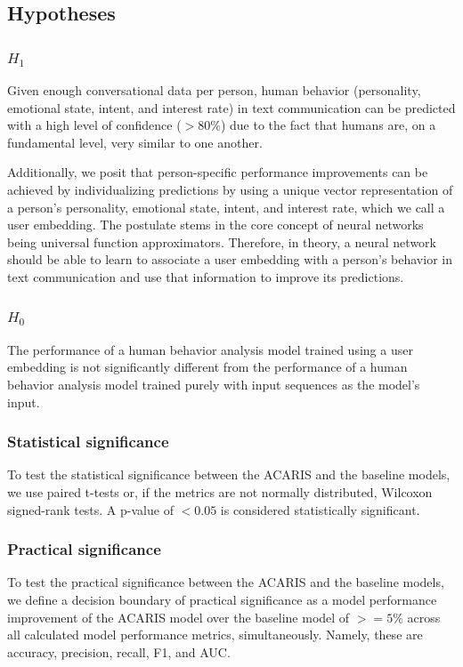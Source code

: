 \documentclass{article}
\begin{document}
\subsection{Hypotheses}
\subsubsection{$H_1$}
Given enough conversational data per person, human behavior (personality, emotional state, intent, and interest rate) in text communication can be predicted with a high level of confidence ($>80\%$) due to the fact that humans are, on a fundamental level, very similar to one another.

Additionally, we posit that person-specific performance improvements can be achieved by individualizing predictions by using a unique vector representation of a person's personality, emotional state, intent, and interest rate, which we call a user embedding. The postulate stems in the core concept of neural networks being universal function approximators. Therefore, in theory, a neural network should be able to learn to associate a user embedding with a person's behavior in text communication and use that information to improve its predictions.

\subsubsection{$H_0$}
The performance of a human behavior analysis model trained using a user embedding is not significantly different from the performance of a human behavior analysis model trained purely with input sequences as the model's input.

\subsubsection{Statistical significance}
To test the statistical significance between the ACARIS and the baseline models, we use paired t-tests or, if the metrics are not normally distributed, Wilcoxon signed-rank tests. A p-value of $<0.05$ is considered statistically significant.

\subsubsection{Practical significance}
To test the practical significance between the ACARIS and the baseline models, we define a decision boundary of practical significance as a model performance improvement of the ACARIS model over the baseline model of $>=5\%$ across all calculated model performance metrics, simultaneously. Namely, these are accuracy, precision, recall, F1, and AUC.
\end{document}
